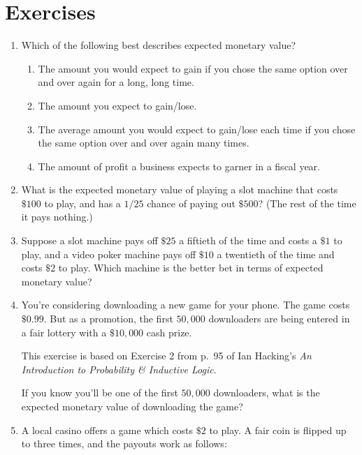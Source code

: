 \documentclass[justified]{tufte-book}
\providecommand{\tightlist}{%
  \setlength{\itemsep}{0pt}\setlength{\parskip}{0pt}}
\theoremstyle{definition}
\theoremstyle{definition}
\theoremstyle{definition}
\theoremstyle{definition}
\theoremstyle{remark}
\begin{document}
\hypertarget{exercises-9}{%
\section*{Exercises}\label{exercises-9}}

\begin{enumerate}
\item
  Which of the following best describes expected monetary value?

  \begin{enumerate}
  \def\labelenumii{\alph{enumii}.}
  \tightlist
  \item
    The amount you would expect to gain if you chose the same option over and over again for a long, long time.
  \item
    The amount you expect to gain/lose.
  \item
    The average amount you would expect to gain/lose each time if you chose the same option over and over again many times.
  \item
    The amount of profit a business expects to garner in a fiscal year.
  \end{enumerate}
\item
  What is the expected monetary value of playing a slot machine that costs \(\$100\) to play, and has a \(1/25\) chance of paying out \(\$500\)? (The rest of the time it pays nothing.)
\item
  Suppose a slot machine pays off \(\$25\) a fiftieth of the time and costs a \(\$1\) to play, and a video poker machine pays off \(\$10\) a twentieth of the time and costs \(\$2\) to play. Which machine is the better bet in terms of expected monetary value?
\item
  You're considering downloading a new game for your phone. The game costs \(\$0.99\). But as a promotion, the first \(50,000\) downloaders are being entered in a fair lottery with a \(\$10,000\) cash prize.

  \begin{marginfigure}
  This exercise is based on Exercise 2 from p.~95 of Ian Hacking's
  \emph{An Introduction to Probability \& Inductive Logic}.
  \end{marginfigure}

  If you know you'll be one of the first \(50,000\) downloaders, what is the expected monetary value of downloading the game?
\item
  A local casino offers a game which costs \(\$2\) to play. A fair coin is flipped up to three times, and the payouts work as follows:


\end{enumerate}
\end{document}
